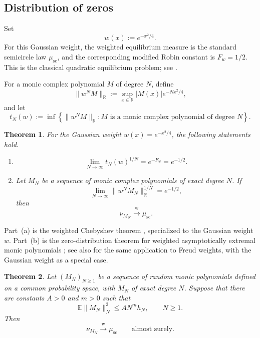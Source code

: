 \documentclass[11pt,reqno]{amsart}
\numberwithin{equation}{section}
\newtheorem{theorem}{Theorem}[section]
\theoremstyle{definition}
\theoremstyle{remark}
\newcommand{\E}{\mathbb E}
\newcommand{\R}{\mathbb R}
\newcommand{\1}{\mathbf 1}
\newcommand{\weak}{\xrightarrow{\mathrm w}}
\begin{document}
\subsection{Distribution of zeros}
Set
\[
  w(x):=e^{-x^2/4}.
\]
For this Gaussian weight, the weighted equilibrium measure is the standard
semicircle law \(\mu_{\mathrm{sc}}\), and the corresponding modified Robin
constant is \(F_w=1/2\).  This is the classical quadratic equilibrium
problem; see \cite[Exercise~2.6.4]{AndersonGuionnetZeitouni2010}.


For a monic complex polynomial \(M\) of degree \(N\), define
\[
  \|w^NM\|_{\R}
  :=
  \sup_{x\in\R}|M(x)|e^{-Nx^2/4},
\]
and let
\begin{equation}\label{eq:weighted-Chebyshev-number}
  t_N(w)
  :=
  \inf\left\{
    \|w^NM\|_{\R}:
    M\text{ is a monic complex polynomial of degree }N
  \right\}.
\end{equation}


\begin{theorem}\label{thm:Saff-Totik-specialized}
For the Gaussian weight \(w(x)=e^{-x^2/4}\), the following statements hold.
\begin{enumerate}[label=\textup{(\alph*)},leftmargin=2em]
\item
\begin{equation}\label{eq:weighted-Chebyshev-limit}
  \lim_{N\to\infty}t_N(w)^{1/N}=e^{-F_w}=e^{-1/2}.
\end{equation}

\item
Let \(M_N\) be a sequence of monic complex polynomials of exact degree
\(N\).  If
\begin{equation}\label{eq:weighted-asymptotic-extremality}
  \lim_{N\to\infty}\|w^NM_N\|_{\R}^{1/N}=e^{-1/2},
\end{equation}
then
\[
  \nu_{M_N}\weak\mu_{\mathrm{sc}}.
\]
\end{enumerate}
\end{theorem}

Part~\textup{(a)} is the weighted Chebyshev theorem
\cite[Chapter~III, Theorem~3.1]{SaffTotik1997}, specialized to the
Gaussian weight \(w\).  Part~\textup{(b)} is the
zero-distribution theorem for weighted asymptotically extremal monic
polynomials \cite[Chapter~III, Theorem~4.2, p.~170]{SaffTotik1997}; see
also \cite[proof of Theorem~2.3]{PritskerXie2015} for the same application
to Freud weights, with the Gaussian weight as a special case. 


\begin{theorem}\label{thm:polynomial-excess-criterion}
Let \((M_N)_{N\ge1}\) be a sequence of random monic polynomials defined on
a common probability space, with \(M_N\) of exact degree \(N\).  Suppose
that there are constants \(A>0\) and \(m>0\) such that
\[
  \E\|M_N\|_N^2\le A N^m h_N,
  \qquad N\ge1.
\]
Then
\[
  \nu_{M_N}\weak\mu_{\mathrm{sc}}
  \qquad\text{almost surely.}
\]
\end{theorem}
\end{document}
